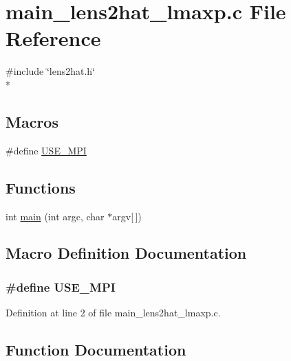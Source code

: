 \section{main\-\_\-lens2hat\-\_\-lmaxp.\-c File Reference}
\label{main__lens2hat__lmaxp_8c}
{\ttfamily \#include \char`\"{}lens2hat.\-h\char`\"{}}\\*
\subsection*{Macros}
\begin{DoxyCompactItemize}
\item 
\#define \hyperlink{main__lens2hat__lmaxp_8c_a3869d282031f6ea6b50fdb980b758420}{U\-S\-E\-\_\-\-M\-P\-I}
\end{DoxyCompactItemize}
\subsection*{Functions}
\begin{DoxyCompactItemize}
\item 
int \hyperlink{main__lens2hat__lmaxp_8c_a0ddf1224851353fc92bfbff6f499fa97}{main} (int argc, char $\ast$argv\mbox{[}$\,$\mbox{]})
\end{DoxyCompactItemize}


\subsection{Macro Definition Documentation}
\subsubsection[{U\-S\-E\-\_\-\-M\-P\-I}]{\setlength{\rightskip}{0pt plus 5cm}\#define U\-S\-E\-\_\-\-M\-P\-I}\label{main__lens2hat__lmaxp_8c_a3869d282031f6ea6b50fdb980b758420}


Definition at line 2 of file main\-\_\-lens2hat\-\_\-lmaxp.\-c.



\subsection{Function Documentation}
